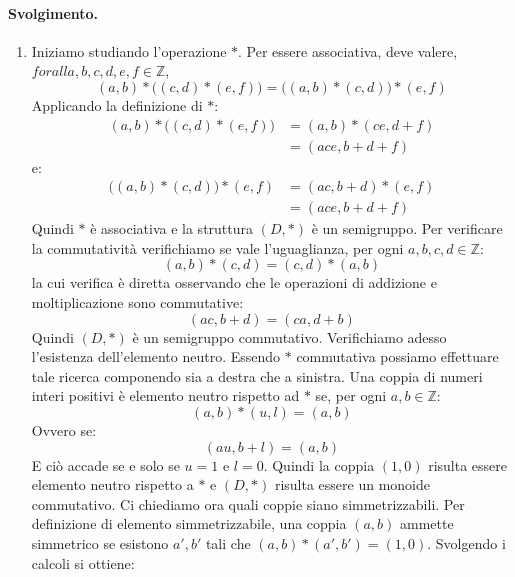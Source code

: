 \paragraph*{Svolgimento.} \begin{enumerate}
	\item Iniziamo studiando l'operazione $\ast$. Per essere associativa, deve valere, $forall a,b,c,d,e,f \in \mathbb{Z}$,
	\begin{displaymath}
		(a,b) \ast \bigl((c,d) \ast (e,f)\bigr) = \bigl((a,b) \ast (c,d)\bigr) \ast (e,f)
	\end{displaymath}
	Applicando la definizione di $\ast$:
	\begin{align*}
		(a,b) \ast \bigl((c,d) \ast (e,f)\bigr) &= (a,b) \ast (ce, d+f)\\
		&= (ace,b+d+f)
	\end{align*}
	e:
	\begin{align*}
		\bigl((a,b) \ast (c,d)\bigr) \ast (e,f) &= (ac,b+d) \ast (e,f)\\
		&= (ace,b+d+f)
	\end{align*}
	Quindi $\ast$ è associativa e la struttura $(D,\ast)$ è un semigruppo. Per verificare la commutatività verifichiamo se vale l'uguaglianza, per ogni $a,b,c,d \in \mathbb{Z}$:
	\begin{displaymath}
		(a,b) \ast (c,d) = (c,d) \ast (a,b)
	\end{displaymath}
	la cui verifica è diretta osservando che le operazioni di addizione e moltiplicazione sono commutative:
	\begin{displaymath}
		(ac,b+d)=(ca,d+b)
	\end{displaymath}
	Quindi $(D,\ast)$ è un semigruppo commutativo. Verifichiamo adesso l'esistenza dell'elemento neutro. Essendo $\ast$ commutativa possiamo effettuare tale ricerca componendo sia a destra che a sinistra. Una coppia di numeri interi positivi è elemento neutro rispetto ad $\ast$ se, per ogni $a,b \in \mathbb{Z}$:
	\begin{displaymath}
		(a,b) \ast (u,l) = (a,b)
	\end{displaymath}
	Ovvero se:
	\begin{displaymath}
		(au,b+l) = (a,b)
	\end{displaymath}
	E ciò accade se e solo se $u=1$ e $l=0$. Quindi la coppia $(1,0)$ risulta essere elemento neutro rispetto a $\ast$ e $(D,\ast)$ risulta essere un monoide commutativo. Ci chiediamo ora quali coppie siano simmetrizzabili. Per definizione di elemento simmetrizzabile, una coppia $(a,b)$ ammette simmetrico se esistono $a',b'$ tali che $(a,b) \ast (a',b')=(1,0)$. Svolgendo i calcoli si ottiene:

\end{enumerate}
